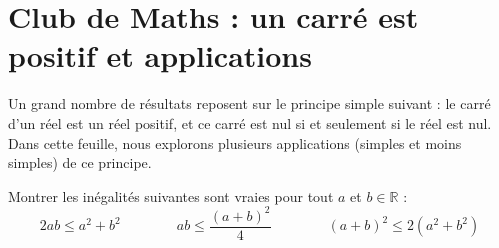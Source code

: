 \documentclass[main.tex]{subfiles}
\begin{document}
%	 
 
\newpage 
{}  
\pagestyle{scrheadings} %
\onehalfspacing 
 
 
\section{Club de Maths : un carré est positif et applications}

\begin{eBox}
	Un grand nombre de résultats reposent sur le principe simple suivant : le carré d’un réel est un réel positif, et ce carré est nul si et seulement si le réel est nul. Dans cette feuille, nous explorons plusieurs 
	applications (simples et moins simples) de ce principe.
	\end{eBox}

\begin{problem}\label{chapter08:problem:00} \hfill 
	
	 Montrer les inégalités suivantes sont vraies pour tout $a$ et $b\in\mathbb{R}$ :
	$$
	2ab\leqslant a^2+b^2
	\qquad\qquad 
	ab\leqslant \frac{(a+b)^2}{4}
	\qquad\qquad 
	(a+b)^2\leqslant 2(a^2+b^2)
	$$ 
\end{problem} 
\end{document}
